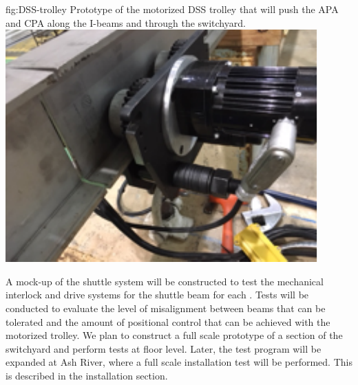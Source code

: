 \begin{dunefigure}{fig:DSS-trolley}
  {Prototype of the motorized DSS trolley that will push the APA and CPA along the I-beams and through the switchyard.}
\includegraphics[width=.49\textwidth]{graphics/DSS-trolley.pdf}
\end{dunefigure}



A mock-up of the shuttle system will be constructed to test the
mechanical interlock and drive systems for the shuttle beam
for each .  Tests will be conducted to evaluate the level of
misalignment between beams that can be tolerated and the amount of
positional control that can be achieved with the motorized trolley. We plan to construct a full scale prototype of a section of the  switchyard and perform tests at floor level. Later, the test program will be expanded at Ash River, where a full scale installation test will be performed. This is described in the installation  section.
